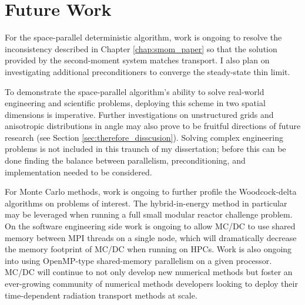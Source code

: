 \section{Future Work}

For the space-parallel deterministic algorithm, work is ongoing to resolve the inconsistency described in Chapter \ref{chap:smom_paper} so that the solution provided by the second-moment system matches transport.
I also plan on investigating additional preconditioners to converge the steady-state thin limit.

To demonstrate the space-parallel algorithm's ability to solve real-world engineering and scientific problems, deploying this scheme in two spatial dimensions is imperative.
Further investigations on unstructured grids and anisotropic distributions in angle may also prove to be fruitful directions of future research (see Section \ref{sec:therefore_disscusion}).
Solving complex engineering problems is not included in this traunch of my dissertation; before this can be done finding the balance between parallelism, preconditioning, and implementation needed to be considered.

For Monte Carlo methods, work is ongoing to further profile the Woodcock-delta algorithms on problems of interest.
The hybrid-in-energy method in particular may be leveraged when running a full small modular reactor challenge problem.
On the software engineering side work is ongoing to allow MC/DC to use shared memory between MPI threads on a single node, which will dramatically decrease the memory footprint of MC/DC when running on HPCs.
Work is also ongoing into using OpenMP-type shared-memory parallelism on a given processor.
MC/DC will continue to not only develop new numerical methods but foster an ever-growing community of numerical methods developers looking to deploy their time-dependent radiation transport methods at scale.